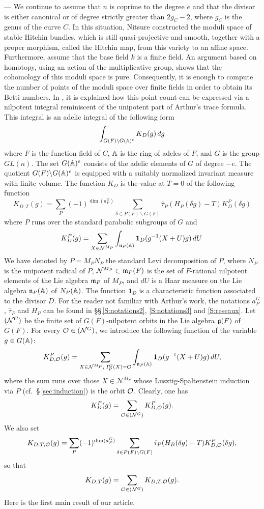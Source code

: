 \begin{paragr} --- We continue to assume that $n$ is coprime to the degree $e$ and that the divisor is either canonical or of degree strictly greater than $2g_C-2$, where $g_C$ is the genus of the curve $C$. In this situation, Nitsure constructed the moduli space of stable Hitchin bundles, which is still quasi-projective and smooth, together with a proper morphism, called the Hitchin map, from this variety to an affine space. Furthermore, assume that the base field $k$ is a finite field. An argument based on homotopy, using an action of the multiplicative group, shows that the cohomology of this moduli space is pure. Consequently, it is enough to compute the number of points of the moduli space over finite fields in order to obtain its Betti numbers. In \cite{scfh}, it is explained how this point count can be expressed via a nilpotent integral reminiscent of the unipotent part of Arthur's trace formula. This integral is an adelic integral of the following form
  \begin{equation}
    \label{eq:int-arthurienne}
    \int_{G(F)\backslash G(\mathbb{A})^e} K_D(g)\, dg
  \end{equation}
where $F$ is the function field of $C$, $\mathbb{A}$ is the ring of adeles of $F$, and $G$ is the group $GL(n)$. The set $G(\mathbb{A})^e$ consists of the adelic elements of $G$ of degree $-e$. The quotient $G(F)\backslash G(\mathbb{A})^e$ is equipped with a suitably normalized invariant measure with finite volume. The function $K_D$ is the value at $T=0$ of the following function 
$$K_{D,T}(g)= \sum_P (-1)^{\dim(a_P^G)} \sum_{\delta\in P(F)\backslash G(F)}\hat{\tau}_P(H_P(\delta g)-T) K^P_D(\delta g)$$
where $P$ runs over the standard parabolic subgroups of $G$ and 
$$K^P_D(g)=   \sum_{X\in \mathcal{N}^{M_P}} \int_{\mathfrak{n}_P(\mathbb{A})} \mathbf{1}_D(g^{-1}(X+U)g)\,dU.$$
We have denoted by $P=M_PN_P$ the standard Levi decomposition of $P$, where $N_P$ is the unipotent radical of $P$, $\mathcal{N}^{M_P}\subset \mathfrak{m}_P(F)$ is the set of $F$-rational nilpotent elements of the Lie algebra $\mathfrak{m}_P$ of $M_P$, and $dU$ is a Haar measure on the Lie algebra $\mathfrak{n}_P(\mathbb{A})$ of $N_P(\mathbb{A})$. The function $\mathbf{1}_D$ is a characteristic function associated to the divisor $D$. For the reader not familiar with Arthur's work, the notations $a_P^G$, $\hat{\tau}_P$ and $H_P$ can be found in \S\S\,\ref{S:notations2}, \ref{S:notations3} and \ref{S:reseaux}. Let $(\mathcal{N}^{G})$ be the finite set of $G(F)$-nilpotent orbits in the Lie algebra $\mathfrak{g}(F)$ of $G(F)$. For every $\mathcal{O}\in (\mathcal{N}^G)$, we introduce the following function of the variable $g\in G(\mathbb{A})$:
$$ K^{P}_{D,\mathcal{O}}(g)=\sum_{X\in \mathcal{N}^{M_P},\; I_P^G(X)=\mathcal{O}} \int_{\mathfrak{n}_P(\mathbb{A})}  \mathbf{1}_D(g^{-1}(X+U)g)\,dU,$$
where the sum runs over those $X\in \mathcal{N}^{M_P}$ whose Lusztig-Spaltenstein induction via $P$ (cf.\ \S\,\ref{sec:induction}) is the orbit $\mathcal{O}$. Clearly, one has
$$K^{P}_{D}(g)=\sum_{\mathcal{O}\in (\mathcal{N}^G)}K^{P}_{D,\mathcal{O}}(g).$$
We also set
$$K_{D,T,\mathcal{O}}(g)= \sum_{P} (-1)^{\dim(a_P^G)} \sum_{\delta\in P(F)\backslash G(F)} \hat{\tau}_P(H_B(\delta g)-T) K^{P}_{D,\mathcal{O}}(\delta g),$$
so that
$$K_{D,T}(g)=\sum_{\mathcal{O}\in (\mathcal{N}^G)}K_{D,T,\mathcal{O}}(g).$$
Here is the first main result of our article.


\end{paragr}
